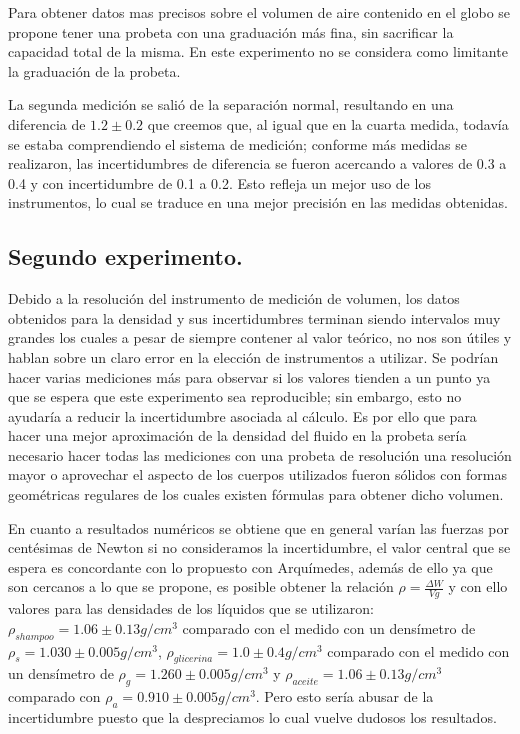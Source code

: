 \documentclass[a4paper]{article}
\begin{document}
Para obtener datos mas precisos sobre el volumen de aire contenido en el globo se propone tener una probeta con una graduación más fina, sin sacrificar la capacidad total de la misma. En este experimento no se considera como limitante la graduación de la probeta.

La segunda medición se salió de la separación normal, resultando en una diferencia de $1.2\pm0.2$ que creemos que, al igual que en la cuarta medida, todavía se estaba comprendiendo el sistema de medición;  conforme más medidas se realizaron, las incertidumbres de diferencia se fueron acercando a valores de 0.3 a 0.4 y con incertidumbre de 0.1 a 0.2. Esto refleja un mejor uso de los instrumentos, lo cual se traduce en una mejor precisión en las medidas obtenidas.

\subsection*{Segundo experimento.}
Debido a la resolución del instrumento de medición de volumen, los datos obtenidos para la densidad y sus incertidumbres terminan siendo intervalos muy grandes los cuales a pesar de siempre contener al valor teórico, no nos son útiles y hablan sobre un claro error en la elección de instrumentos a utilizar. Se podrían hacer varias mediciones más para observar si los valores tienden a un punto ya que se espera que este experimento sea reproducible; sin embargo, esto no ayudaría a reducir la incertidumbre asociada al cálculo. Es por ello que para hacer una mejor aproximación de la densidad del fluido en la probeta sería necesario hacer todas las mediciones  con una probeta de resolución una resolución mayor o aprovechar el aspecto de los cuerpos utilizados fueron sólidos con formas geométricas regulares de los cuales existen fórmulas para obtener dicho volumen.

En cuanto a resultados numéricos se obtiene que en general varían las fuerzas por centésimas de Newton si no consideramos la incertidumbre, el valor central que se espera es concordante con lo propuesto con Arquímedes, además de ello ya que son cercanos a lo que se propone, es posible obtener la relación $\rho = \frac{\Delta W}{Vg}$ y con ello valores para las densidades de los líquidos que se utilizaron: $\rho_{shampoo} = 1.06\pm0.13g/cm^3$ comparado con el medido con un densímetro de $\rho_{s} = 1.030\pm0.005 g/cm^3$, $\rho_{glicerina} = 1.0\pm0.4 g/cm^3$ comparado con el medido con un densímetro de $\rho_{g} = 1.260\pm0.005 g/cm^3$ y $\rho_{aceite} = 1.06\pm0.13 g/cm^3$ comparado con $\rho_{a} = 0.910 \pm 0.005 g/cm^3$. Pero esto sería abusar de la incertidumbre puesto que la despreciamos lo cual vuelve dudosos los resultados.
\end{document}
